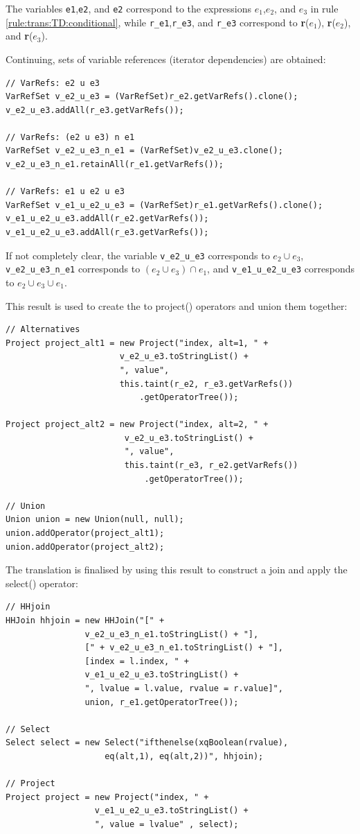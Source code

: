 The variables \texttt{e1},\texttt{e2}, and \texttt{e2} correspond to the
expressions $e_1$,$e_2$, and $e_3$ in rule \ref{rule:trans:TD:conditional},
while \texttt{r\_e1},\texttt{r\_e3}, and \texttt{r\_e3} correspond to
\textbf{r}($e_1$), \textbf{r}($e_2$), and \textbf{r}($e_3$).

Continuing, sets of variable references (iterator dependencies) are obtained:
         
\begin{Verbatim}
// VarRefs: e2 u e3
VarRefSet v_e2_u_e3 = (VarRefSet)r_e2.getVarRefs().clone();
v_e2_u_e3.addAll(r_e3.getVarRefs());

// VarRefs: (e2 u e3) n e1
VarRefSet v_e2_u_e3_n_e1 = (VarRefSet)v_e2_u_e3.clone();
v_e2_u_e3_n_e1.retainAll(r_e1.getVarRefs());

// VarRefs: e1 u e2 u e3
VarRefSet v_e1_u_e2_u_e3 = (VarRefSet)r_e1.getVarRefs().clone();
v_e1_u_e2_u_e3.addAll(r_e2.getVarRefs());
v_e1_u_e2_u_e3.addAll(r_e3.getVarRefs());
\end{Verbatim}

If not completely clear, the variable \texttt{v\_e2\_u\_e3} corresponds to
$e_2 \cup e_3$, \texttt{v\_e2\_u\_e3\_n\_e1} corresponds to $(e_2 \cup e_3) \cap
e_1$, and \texttt{v\_e1\_u\_e2\_u\_e3} corresponds to $e_2 \cup e_3 \cup
e_1$.

This result is used to create the to \textsf{project()} operators and union
them together:

\begin{Verbatim}
// Alternatives
Project project_alt1 = new Project("index, alt=1, " + 
                       v_e2_u_e3.toStringList() + 
                       ", value", 
                       this.taint(r_e2, r_e3.getVarRefs())
                           .getOperatorTree()); 

Project project_alt2 = new Project("index, alt=2, " +
                        v_e2_u_e3.toStringList() + 
                        ", value", 
                        this.taint(r_e3, r_e2.getVarRefs())
                            .getOperatorTree()); 

// Union
Union union = new Union(null, null);
union.addOperator(project_alt1);
union.addOperator(project_alt2);
\end{Verbatim}

The translation is finalised by using this result to construct a join and apply
the \textsf{select()} operator:

\begin{Verbatim}
// HHjoin
HHJoin hhjoin = new HHJoin("[" + 
                v_e2_u_e3_n_e1.toStringList() + "],
                [" + v_e2_u_e3_n_e1.toStringList() + "], 
                [index = l.index, " + 
                v_e1_u_e2_u_e3.toStringList() +
                ", lvalue = l.value, rvalue = r.value]", 
                union, r_e1.getOperatorTree());

// Select
Select select = new Select("ifthenelse(xqBoolean(rvalue), 
                    eq(alt,1), eq(alt,2))", hhjoin);

// Project
Project project = new Project("index, " + 
                  v_e1_u_e2_u_e3.toStringList() +
                  ", value = lvalue" , select);
\end{Verbatim}
